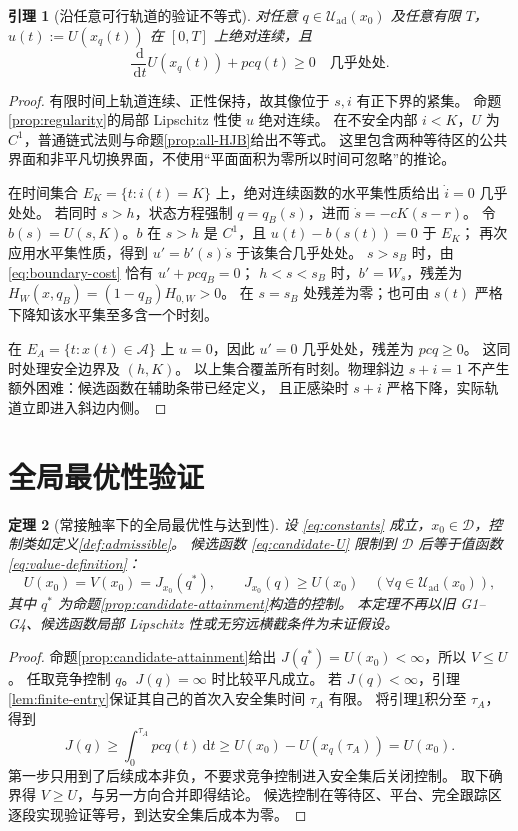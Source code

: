 \documentclass[11pt,a4paper,UTF8]{ctexart}
\newtheorem{theorem}{定理}[section]
\newtheorem{lemma}[theorem]{引理}
\theoremstyle{definition}
\newcommand{\Acal}{\mathcal A}
\newcommand{\Dcal}{\mathcal D}
\newcommand{\Uad}{\mathcal U_{\mathrm{ad}}}
\newcommand{\dd}{\,\mathrm d}
\begin{document}
\begin{lemma}[沿任意可行轨道的验证不等式]
\label{lem:trajectory-verification}
对任意 $q\in\Uad(x_0)$ 及任意有限 $T$，$u(t):=U(x_q(t))$ 在 $[0,T]$ 上绝对连续，且
\begin{equation}
\frac{\dd}{\dd t}U(x_q(t))+pcq(t)\ge0\quad\text{几乎处处}.
\label{eq:verification-ineq}
\end{equation}
\end{lemma}
\begin{proof}
有限时间上轨道连续、正性保持，故其像位于 $s,i$ 有正下界的紧集。
命题\ref{prop:regularity}的局部 Lipschitz 性使 $u$ 绝对连续。
在不安全内部 $i<K$，$U$ 为 $C^1$，普通链式法则与命题\ref{prop:all-HJB}给出不等式。
这里包含两种等待区的公共界面和非平凡切换界面，不使用“平面面积为零所以时间可忽略”的推论。

在时间集合 $E_K=\{t:i(t)=K\}$ 上，绝对连续函数的水平集性质给出 $\dot i=0$ 几乎处处。
若同时 $s>h$，状态方程强制 $q=q_B(s)$，进而 $\dot s=-cK(s-r)$。
令 $b(s)=U(s,K)$。$b$ 在 $s>h$ 是 $C^1$，且 $u(t)-b(s(t))=0$ 于 $E_K$；
再次应用水平集性质，得到 $u'=b'(s)\dot s$ 于该集合几乎处处。
$s>s_B$ 时，由 \eqref{eq:boundary-cost} 恰有 $u'+pcq_B=0$；
$h<s<s_B$ 时，$b'=W_s$，残差为 $H_W(x,q_B)=(1-q_B)H_{0,W}>0$。
在 $s=s_B$ 处残差为零；也可由 $s(t)$ 严格下降知该水平集至多含一个时刻。

在 $E_A=\{t:x(t)\in\Acal\}$ 上 $u=0$，因此 $u'=0$ 几乎处处，残差为 $pcq\ge0$。
这同时处理安全边界及 $(h,K)$。
以上集合覆盖所有时刻。物理斜边 $s+i=1$ 不产生额外困难：候选函数在辅助条带已经定义，
且正感染时 $s+i$ 严格下降，实际轨道立即进入斜边内侧。
\end{proof}

\section{全局最优性验证}
\label{sec:global-verification}
\begin{theorem}[常接触率下的全局最优性与达到性]
\label{thm:verification}
设 \eqref{eq:constants} 成立，$x_0\in\Dcal$，控制类如定义\ref{def:admissible}。
候选函数 \eqref{eq:candidate-U} 限制到 $\Dcal$ 后等于值函数 \eqref{eq:value-definition}：
\begin{equation}
U(x_0)=V(x_0)=J_{x_0}(q^*),\qquad
J_{x_0}(q)\ge U(x_0)\quad(\forall q\in\Uad(x_0)),
\label{eq:global-optimality}
\end{equation}
其中 $q^*$ 为命题\ref{prop:candidate-attainment}构造的控制。
本定理不再以旧 G1--G4、候选函数局部 Lipschitz 性或无穷远横截条件为未证假设。
\end{theorem}
\begin{proof}
命题\ref{prop:candidate-attainment}给出 $J(q^*)=U(x_0)<\infty$，所以 $V\le U$。
任取竞争控制 $q$。$J(q)=\infty$ 时比较平凡成立。
若 $J(q)<\infty$，引理\ref{lem:finite-entry}保证其自己的首次入安全集时间 $\tau_A$ 有限。
将引理\ref{lem:trajectory-verification}积分至 $\tau_A$，得到
\[
J(q)\ge\int_0^{\tau_A}pcq(t)\dd t
\ge U(x_0)-U(x_q(\tau_A))=U(x_0).
\]
第一步只用到了后续成本非负，不要求竞争控制进入安全集后关闭控制。
取下确界得 $V\ge U$，与另一方向合并即得结论。
候选控制在等待区、平台、完全跟踪区逐段实现验证等号，到达安全集后成本为零。
\end{proof}
\end{document}
